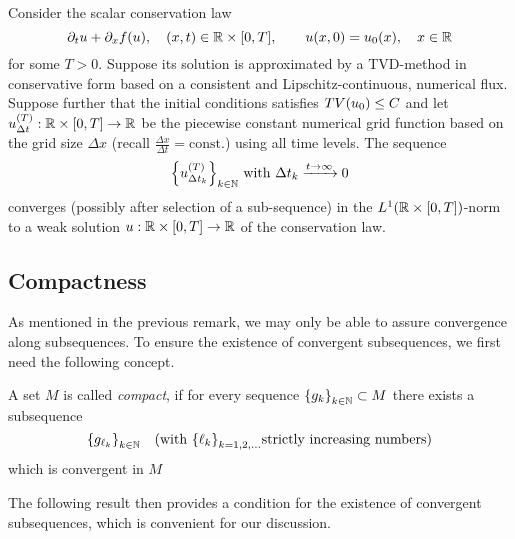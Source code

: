 \begin{theorem}
	Consider the scalar conservation law
	\[
		\partial_t u + \partial_x f\parentheses*{u}, \quad \parentheses*{x, t} \in \R \times \brackets*{0, T}, \qquad u\parentheses*{x, 0} = u_0\parentheses*{x}, \quad x \in \R
	\]
	for some \(T > 0\).
	Suppose its solution is approximated by a TVD-method in conservative form based on a consistent and Lipschitz-continuous, numerical flux.
	Suppose further that the initial conditions satisfies \(TV\parentheses*{u_0} \le C\) and let \(u_{\Delta t}^{\parentheses*{T}}: \R \times \brackets*{0, T} \to \R\) be the piecewise constant numerical grid function based on the grid size \(\Delta x\) (recall \(\frac{\Delta x}{\Delta t} = \text{const.}\)) using all time levels.
	The sequence
	\[
		\braces*{u_{\Delta t_k}^{\parentheses*{T}}}_{k \in \N}\text{ with }\Delta t_k \xrightarrow{t \to \infty} 0
	\]
	converges (possibly after selection of a sub-sequence) in the \(L^1\parentheses*{\R \times \brackets*{0, T}}\)-norm to a weak solution \(u: \R \times \brackets*{0, T} \to \R\) of the conservation law.
\end{theorem}

\begin{remark}
	
\end{remark}


\subsection{Compactness}

As mentioned in the previous remark, we may only be able to assure convergence along subsequences.
To ensure the existence of convergent subsequences, we first need the following concept.

\begin{definition}[Compactness]
	A set \(M\) is called \emph{compact}, if for every sequence \(\braces*{g_k}_{k \in \N} \subset M\) there exists a subsequence
	\[
		\braces*{g_{\ell_k}}_{k \in \N} \quad \text{(with }\braces*{\ell_k}_{k = 1, 2, \ldots}\text{strictly increasing numbers)}
	\]
	which is convergent in \(M\)
\end{definition}

\begin{example}[Compactness]
	
\end{example}

The following result then provides a condition for the existence of convergent subsequences,
which is convenient for our discussion.

\begin{theorem}[Compactness in BV]
	
\end{theorem}